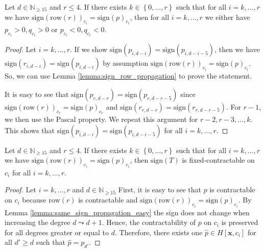 \begin{lemma}\label{lemma:same_sign_propagation_easy}
    Let \( d \in \mathbb{N}_{\geq 15} \) and \( r \leq 4 \). If there exists \( k \in \left\{ 0, \dots, r \right\} \) such that for all \( i = k, \dots, r\) we have \(  \mathrm{sign}(\mathrm{row}(r))_{c_i} = \mathrm{sign}(p)_{c_i} \),
    then for all \( i = k, \dots, r\) we either have \( p_{c_i} > 0, q_{c_i} > 0 \) or \( p_{c_i} < 0, q_{c_i} < 0 \).
\end{lemma}
  
\begin{proof}
    Let \( i=k, \dots, r \). If we show \( \mathrm{sign}(p_{i,d-i}) = \mathrm{sign}(p_{i,d-i-5}) \), then we have $\mathrm{sign}(r_{i,d-i}) = \mathrm{sign}(p_{i,d-i})$ by assumption \( \mathrm{sign}(\mathrm{row}(r))_{c_i} = \mathrm{sign}(p)_{c_i} \). So, we can use Lemma \ref{lemma:sign_row_propagation} to prove the statement.

    It is easy to see that \( \mathrm{sign}(p_{r,d-r}) = \mathrm{sign}(p_{r,d-r-5}) \) since \( \mathrm{sign}(\mathrm{row}(r))_{c_r} = \mathrm{sign}(p)_{c_r} \) and \( \mathrm{sign}(r_{r,d-r}) = \mathrm{sign}(r_{r, d - r - 5}) \). For \( r - 1 \), we then use the Pascal property. We repeat this argument for \( r-2, r-3, \dots, k \). This shows that \( \mathrm{sign}(p_{i,d-i}) = \mathrm{sign}(p_{i,d-i-5}) \) for all \( i = k, \dots, r \).
\end{proof}

\begin{proposition}\label{prop:fixed-contraction-homo-row}
    Let \( d \in \mathbb{N}_{\geq 15} \) and \( r \leq 4 \). If there exists \( k \in \left\{ 0, \dots, r \right\} \) such that for all \( i = k, \dots, r\) we have \(  \mathrm{sign}(\mathrm{row}(r))_{c_i} = \mathrm{sign}(p)_{c_i} \),
    then  \( \mathrm{sign}(T) \) is fixed-contractable on \( c_i \) for all \( i = k, \dots, r \).
\end{proposition}

\begin{proof}
    Let \( i = k, \dots, r \) and \( d \in \mathbb{N}_{\geq 15} \)
    First, it is easy to see that \( p \) is contractable on \( c_i \) because \( \mathrm{row}(r) \) is contractable and \( \mathrm{sign}(\mathrm{row}(r))_{c_i} = \mathrm{sign}(p)_{c_i} \). By Lemma \ref{lemma:same_sign_propagation_easy} the sign does not change when increasing the degree \( d \leadsto d+1 \). Hence, the contractability of \( p \) on \( c_i \) is preserved for all degrees greater or equal to \( d \). Therefore, there exists one \( \hat p \in H[\mathbf{x}, c_i] \) for all \( d' \geq d \) such that \( \hat p = p_{d'} \).
\end{proof}


